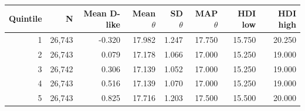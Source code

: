 \begin{tabular}{@{}rrrrrrrr@{}}
\toprule
Quintile & N & Mean D-like & Mean $\theta$ & SD $\theta$ & MAP $\theta$ & HDI low & HDI high \\
\midrule
1 & 26,743 & -0.320 & 17.982 & 1.247 & 17.750 & 15.750 & 20.250 \\
2 & 26,743 & 0.079 & 17.178 & 1.066 & 17.000 & 15.250 & 19.000 \\
3 & 26,742 & 0.306 & 17.139 & 1.052 & 17.000 & 15.250 & 19.000 \\
4 & 26,743 & 0.516 & 17.139 & 1.070 & 17.000 & 15.250 & 19.000 \\
5 & 26,743 & 0.825 & 17.716 & 1.203 & 17.500 & 15.500 & 20.000 \\
\bottomrule
\end{tabular}